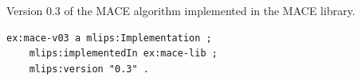 Version 0.3 of the MACE algorithm implemented in the MACE library.
\begin{lstlisting}[language=turtle]
ex:mace-v03 a mlips:Implementation ;
    mlips:implementedIn ex:mace-lib ;
    mlips:version "0.3" .
\end{lstlisting}
